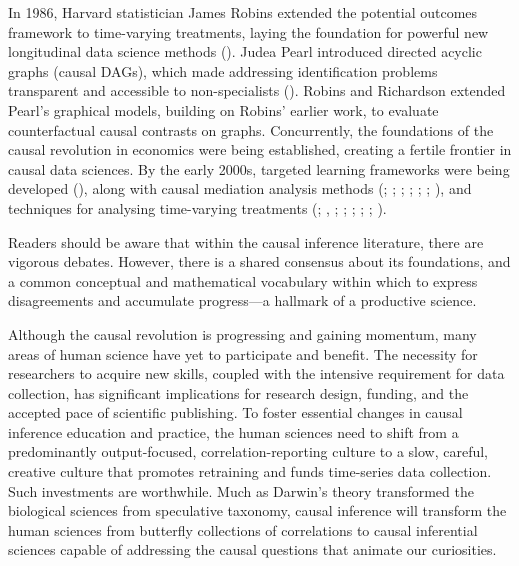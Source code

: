 \documentclass[
  single column]{article}
\begin{document}
In 1986, Harvard statistician James Robins extended the potential
outcomes framework to time-varying treatments, laying the foundation for
powerful new longitudinal data science methods
(). Judea Pearl introduced
directed acyclic graphs (causal DAGs), which made addressing
identification problems transparent and accessible to non-specialists
(). Robins and Richardson extended
Pearl's graphical models, building on Robins' earlier work, to evaluate
counterfactual causal contrasts on graphs. Concurrently, the foundations
of the causal revolution in economics were being established, creating a
fertile frontier in causal data sciences. By the early 2000s, targeted
learning frameworks were being developed
(), along with
causal mediation analysis methods (; ;
;
;
;
;
), and techniques for
analysing time-varying treatments
(;
,
;
;
;
;
;
).

Readers should be aware that within the causal inference literature,
there are vigorous debates. However, there is a shared consensus about
its foundations, and a common conceptual and mathematical vocabulary
within which to express disagreements and accumulate progress---a
hallmark of a productive science.

Although the causal revolution is progressing and gaining momentum, many
areas of human science have yet to participate and benefit. The
necessity for researchers to acquire new skills, coupled with the
intensive requirement for data collection, has significant implications
for research design, funding, and the accepted pace of scientific
publishing. To foster essential changes in causal inference education
and practice, the human sciences need to shift from a predominantly
output-focused, correlation-reporting culture to a slow, careful,
creative culture that promotes retraining and funds time-series data
collection. Such investments are worthwhile. Much as Darwin's theory
transformed the biological sciences from speculative taxonomy, causal
inference will transform the human sciences from butterfly collections
of correlations to causal inferential sciences capable of addressing the
causal questions that animate our curiosities.
\end{document}
